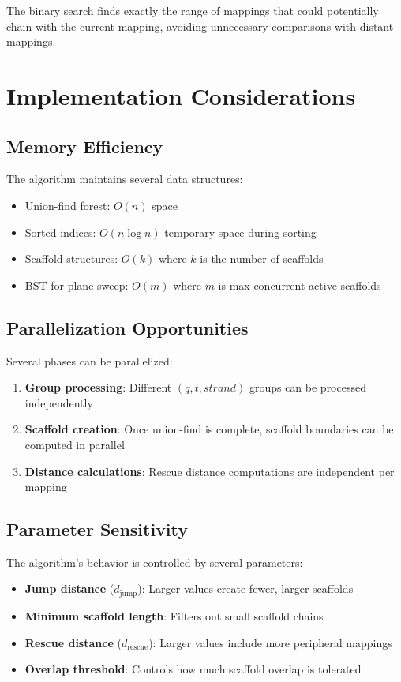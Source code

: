 \documentclass[11pt]{article}
\begin{document}
The binary search finds exactly the range of mappings that could potentially chain with the current mapping, avoiding unnecessary comparisons with distant mappings.

\section{Implementation Considerations}

\subsection{Memory Efficiency}

The algorithm maintains several data structures:
\begin{itemize}
    \item Union-find forest: $O(n)$ space
    \item Sorted indices: $O(n \log n)$ temporary space during sorting
    \item Scaffold structures: $O(k)$ where $k$ is the number of scaffolds
    \item BST for plane sweep: $O(m)$ where $m$ is max concurrent active scaffolds
\end{itemize}

\subsection{Parallelization Opportunities}

Several phases can be parallelized:
\begin{enumerate}
    \item \textbf{Group processing}: Different $(q, t, strand)$ groups can be processed independently
    \item \textbf{Scaffold creation}: Once union-find is complete, scaffold boundaries can be computed in parallel
    \item \textbf{Distance calculations}: Rescue distance computations are independent per mapping
\end{enumerate}

\subsection{Parameter Sensitivity}

The algorithm's behavior is controlled by several parameters:

\begin{itemize}
    \item \textbf{Jump distance} ($d_{\text{jump}}$): Larger values create fewer, larger scaffolds
    \item \textbf{Minimum scaffold length}: Filters out small scaffold chains
    \item \textbf{Rescue distance} ($d_{\text{rescue}}$): Larger values include more peripheral mappings
    \item \textbf{Overlap threshold}: Controls how much scaffold overlap is tolerated
\end{itemize}
\end{document}
